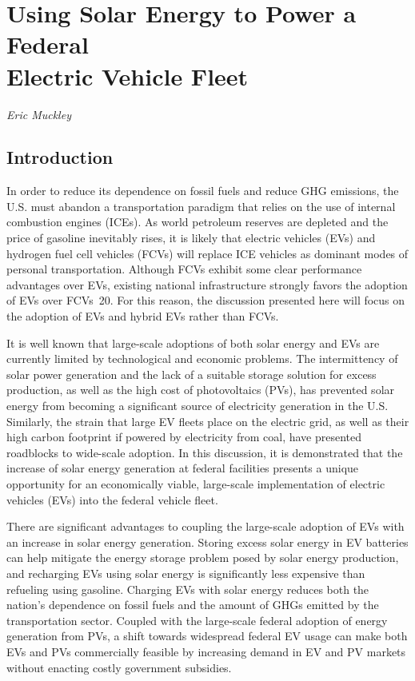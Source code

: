 \section{Using Solar Energy to Power a Federal\\ Electric Vehicle Fleet}

\emph{Eric Muckley}







\subsection{Introduction}

In order to reduce its dependence on fossil fuels and reduce GHG emissions, the U.S. must abandon a transportation paradigm that relies on the use of internal combustion engines (ICEs). As world petroleum reserves are depleted and the price of gasoline inevitably rises, it is likely that electric vehicles (EVs) and hydrogen fuel cell vehicles (FCVs) will replace ICE vehicles as dominant modes of personal transportation. Although FCVs exhibit some clear performance advantages over EVs, existing national infrastructure strongly favors the adoption of EVs over FCVs~\cite{eric}{20}. For this reason, the discussion presented here will focus on the adoption of EVs and hybrid EVs rather than FCVs.  


It is well known that large-scale adoptions of both solar energy and EVs are currently limited by technological and economic problems. The intermittency of solar power generation and the lack of a suitable storage solution for excess production, as well as the high cost of photovoltaics (PVs), has prevented solar energy from becoming a significant source of electricity generation in the U.S. Similarly, the strain that large EV fleets place on the electric grid, as well as their high carbon footprint if powered by electricity from coal, have presented roadblocks to wide-scale adoption. In this discussion, it is demonstrated that the increase of solar energy generation at federal facilities presents a unique opportunity for an economically viable, large-scale implementation of electric vehicles (EVs) into the federal vehicle fleet.

There are significant advantages to coupling the large-scale adoption of EVs with an increase in solar energy generation. Storing excess solar energy in EV batteries can help mitigate the energy storage problem posed by solar energy production, and recharging EVs using solar energy is significantly less expensive than refueling using gasoline. Charging EVs with solar energy reduces both the nation's dependence on fossil fuels and the amount of GHGs emitted by the transportation sector. Coupled with the large-scale federal adoption of energy generation from PVs, a shift towards widespread federal EV usage can make both EVs and PVs commercially feasible by increasing demand in EV and PV markets without enacting costly government subsidies.





